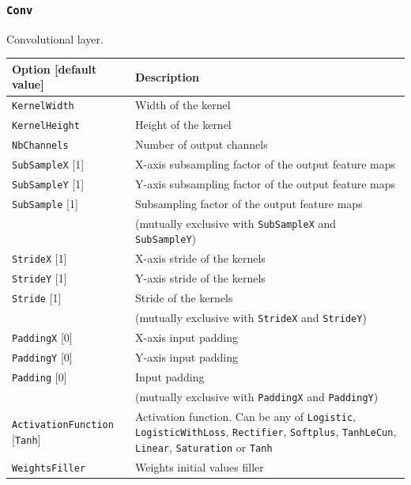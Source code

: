 \documentclass[a4paper,11pt,oneside]{article}
\begin{document}
\subsubsection{\texorpdfstring{%
\lstinline[basicstyle=\ttfamily\bfseries]!Conv!}{Conv}}
Convolutional layer.

\begin{center}
 \begin{longtable}{| p{5cm} | p{10cm} | }
 \hline
 Option [default value] & Description\\
 \hline\hline
  \cellcolor{requiredcolor}\lstinline!KernelWidth! & Width of the kernel \\
  \cellcolor{requiredcolor}\lstinline!KernelHeight! & Height of the kernel \\
  \cellcolor{requiredcolor}\lstinline!NbChannels! & Number of output channels \\
  \lstinline!SubSampleX! [1] & X-axis subsampling factor of the output
  feature maps \\
  \lstinline!SubSampleY! [1] & Y-axis subsampling factor of the output
   feature maps \\
  \lstinline!SubSample! [1] & Subsampling factor of the output feature maps \\
   & (mutually exclusive with \lstinline!SubSampleX!
    and \lstinline!SubSampleY!) \\
  \lstinline!StrideX! [1] & X-axis stride of the kernels \\
  \lstinline!StrideY! [1] & Y-axis stride of the kernels \\
  \lstinline!Stride! [1] & Stride of the kernels \\
   & (mutually exclusive with \lstinline!StrideX! and \lstinline!StrideY!) \\
  \lstinline!PaddingX! [0] & X-axis input padding \\
  \lstinline!PaddingY! [0] & Y-axis input padding \\
  \lstinline!Padding! [0] & Input padding \\
   & (mutually exclusive with \lstinline!PaddingX! and \lstinline!PaddingY!) \\
  \lstinline!ActivationFunction! [\lstinline!Tanh!] & Activation function.
  Can be any of \lstinline!Logistic!,  \lstinline!LogisticWithLoss!,
  \lstinline!Rectifier!, \lstinline!Softplus!, \lstinline!TanhLeCun!,
  \lstinline!Linear!, \lstinline!Saturation! or \lstinline!Tanh! \\
  \lstinline!WeightsFiller! & Weights initial values filler \\

\end{longtable}
\end{center}
\end{document}
